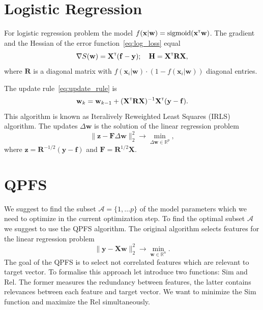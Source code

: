 \documentclass[a4paper,12pt]{article}
\theoremstyle{plain} %
\theoremstyle{definition} %
\theoremstyle{remark} %
\newcommand{\bw}{\mathbf{w}}
\newcommand{\by}{\mathbf{y}}
\newcommand{\bx}{\mathbf{x}}
\newcommand{\bz}{\mathbf{z}}
\newcommand{\cA}{\mathcal{A}}
\newcommand{\bbR}{\mathbb{R}}
\newcommand{\bH}{\mathbf{H}}
\newcommand{\bF}{\mathbf{F}}
\newcommand{\bR}{\mathbf{R}}
\newcommand{\bX}{\mathbf{X}}
\newcommand{\T}{{\text{\tiny\sffamily\upshape\mdseries T}}}
\begin{document}
	\section*{Logistic Regression}
	For logistic regression problem the model $f(\bx | \bw) = \text{sigmoid}(\bx^{\T} \bw)$.
	The gradient and the Hessian of the error function~\eqref{eq:log_loss} equal
	\[
		\nabla S(\bw) = \bX^{\T} (\mathbf{f} - \by); \quad \bH = \bX^{\T} \bR \bX,
	\]
	where $\bR$ is a diagonal matrix with $f(\bx_i | \bw) \cdot (1 - f(\bx_i | \bw))$ diagonal entries.
	
	The update rule~\eqref{eq:update_rule} is
	\[
		\bw_k = \bw_{k - 1} + (\bX^{\T} \bR \bX)^{-1} \bX^{\T} (\by - \mathbf{f}).
	\]
	This algorithm is known as Iteralively Reweighted Least Squares (IRLS) algorithm. The updates $\Delta \bw$ is the solution of the linear regression problem
	\begin{equation}
		\| \bz - \bF \Delta \bw \|_2^2 \rightarrow \min_{\Delta \bw \in \bbR^{p}},
		\label{eq:lin_reg_log_reg}
	\end{equation}
where $\bz = \bR^{-1/2} (\by - \mathbf{f})$ and $\bF = \bR^{1/2}\bX$.
	
	\section*{QPFS}
	We suggest to find the subset $\cA = \{1, \dots p\}$ of the model parameters which we need to optimize in the current optimization step.
	To find the optimal subset $\cA$ we suggest to use the QPFS algorithm.
	The original algorithm selects features for the linear regression problem
	\[
		 \| \by - \bX \bw\|_2^2 \rightarrow\min_{\bw \in \bbR^{n}}.
	\]
	The goal of the QPFS is to select not correlated features which are relevant to target vector.
	To formalise this approach let introduce two functions: Sim and Rel. 
	The former measures the redundancy between features, the latter contains relevances between each feature and target vector. 
	We want to minimize the Sim function and maximize the Rel simultaneously.
	
\end{document}
